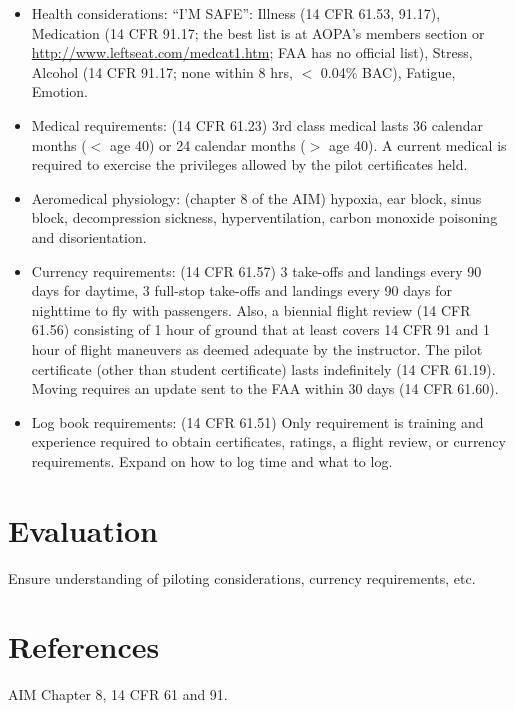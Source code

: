 \begin{itemize}
  \item Health considerations: ``I'M SAFE'': Illness (14 CFR 61.53, 91.17),
    Medication (14 CFR 91.17; the best list is at AOPA's members section or
    \url{http://www.leftseat.com/medcat1.htm}; FAA has no official list),
    Stress, Alcohol (14 CFR 91.17; none within 8 hrs, $<$ 0.04\% BAC), Fatigue,
    Emotion.

  \item Medical requirements: (14 CFR 61.23) 3rd class medical lasts 36
    calendar months ($<$ age 40) or 24 calendar months ($>$ age 40). A current
    medical is required to exercise the privileges allowed by the pilot
    certificates held.

  \item Aeromedical physiology: (chapter 8 of the AIM) hypoxia, ear block,
    sinus block, decompression sickness, hyperventilation, carbon monoxide
    poisoning and disorientation.

  \item Currency requirements: (14 CFR 61.57) 3 take-offs and landings every 90
    days for daytime, 3 full-stop take-offs and landings every 90 days for
    nighttime to fly with passengers. Also, a biennial flight review (14 CFR
    61.56) consisting of 1 hour of ground that at least covers 14 CFR 91 and 1
    hour of flight maneuvers as deemed adequate by the instructor. The pilot
    certificate (other than student certificate) lasts indefinitely (14 CFR
    61.19). Moving requires an update sent to the FAA within 30 days (14 CFR
    61.60).

  \item Log book requirements: (14 CFR 61.51) Only requirement is training and
    experience required to obtain certificates, ratings, a flight review, or
    currency requirements. Expand on how to log time and what to log.

\end{itemize}

\section{Evaluation}

Ensure understanding of piloting considerations, currency requirements, etc.

\section{References}

AIM Chapter 8, 14 CFR 61 and 91.

